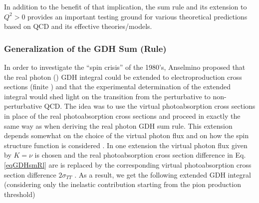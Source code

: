 
In addition to the benefit of that implication, the sum rule and its extension to $Q^2>0$ provides an important testing ground for various theoretical predictions based on QCD and its effective theories/models.









\subsubsection{Generalization of the GDH Sum (Rule)}

In order to investigate the ``spin crisis'' of the 1980's, Anselmino \etal \cite{AnselIoffeLeader} proposed that the real photon () GDH integral could be extended to electroproduction cross sections (finite \qsq) and that the experimental 
determination %
of the extended integral would shed light on the transition from the perturbative to non-perturbative QCD. The idea was to use the virtual photoabsorption cross sections in place of the real photoabsorption cross sections and proceed in exactly the same way as when deriving the real photon GDH sum rule. This extension depends somewhat %
on the choice of the virtual photon flux %
and on how the spin structure function \gtwos is considered \cite{propE06_017}. In one extension the virtual photon flux given by $K=\nu$ %
is chosen and the real photoabsorption cross section difference in Eq. \ref{eqGDHsmRl} are 
is replaced by the corresponding virtual photoabsorption cross section difference $2 \sigma_{TT}$%
. %
As a result, we get the following extended GDH integral (considering only the inelastic contribution starting from the pion production threshold) \cite{pLeaderKuhnChen}

